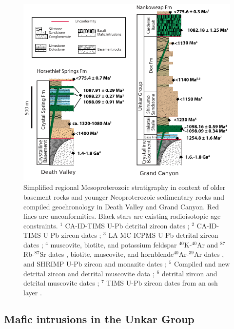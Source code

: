 \begin{figure}[h!]
\centering
\includegraphics[width=\textwidth]{figure/Zhang2024b/DV_GC_Mesoproterozoic_strat_columns.pdf}
\caption[Simplified regional stratigraphy in Death Valley and Grand Canyon]{\footnotesize Simplified regional Mesoproterozoic stratigraphy in context of older basement rocks and younger Neoproterozoic sedimentary rocks and compiled geochronology in Death Valley and Grand Canyon. Red lines are unconformities. Black stars are existing radioisotopic age constraints. $^1$ CA-ID-TIMS U-Pb detrital zircon dates \citep{Dehler2023a}; $^2$ CA-ID-TIMS U-Pb zircon dates \citep{Mohr2024a}; $^3$ LA-MC-ICPMS U-Pb detrital zircon dates \citep{Mahon2014b}; $^4$ muscovite, biotite, and potassium feldspar $^{40}$K-$^{40}$Ar and $^{87}$Rb-$^{87}$Sr dates \citep{Lanphere1964b}, biotite, muscovite, and hornblende$^{40}$Ar-$^{39}$Ar dates \citep{Labotka1985a}, and SHRIMP U-Pb zircon and monazite dates \citep{Barth2001a, Barth2009a}; $^5$ Compiled and new detrital zircon and detrital muscovite data \citep{Mulder2017a}; $^6$ detrital zircon and detrital muscovite dates \citep{Timmons2005a}; $^7$ TIMS U-Pb zircon dates from an ash layer \citep{Timmons2005a}.}
\label{fig:DV_GC_strat_columns}
\end{figure}

\subsection{Mafic intrusions in the Unkar Group}

